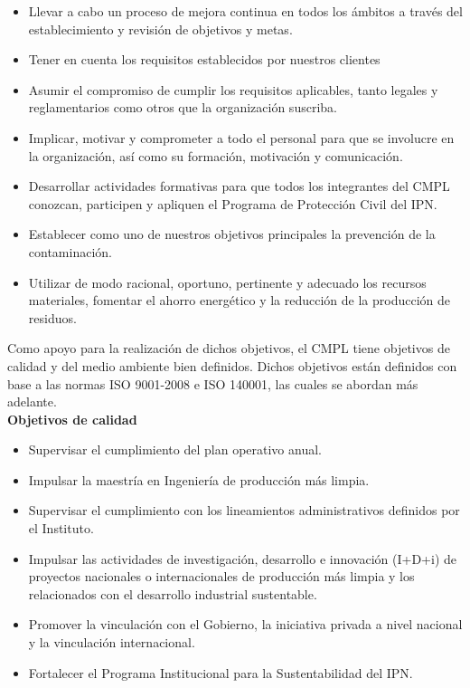 	\begin{itemize}
		\item Llevar a cabo un proceso de mejora continua en todos los ámbitos a través del establecimiento y revisión de objetivos y metas.
		\item Tener en cuenta los requisitos establecidos por nuestros clientes
		\item Asumir el compromiso de cumplir los requisitos aplicables, tanto legales y reglamentarios como otros que la organización suscriba.
		\item Implicar, motivar y comprometer a todo el personal para que se involucre en la organización, así como su formación, motivación y comunicación.
		\item Desarrollar actividades formativas para que todos los integrantes del CMPL conozcan, participen y apliquen el Programa de Protección Civil del IPN.
		\item Establecer como uno de nuestros objetivos principales la prevención de la contaminación. 	\item Utilizar de modo racional, oportuno, pertinente y adecuado los recursos materiales, fomentar el ahorro energético y la reducción de la producción de residuos. 
	\end{itemize}

	Como apoyo para la realización de dichos objetivos, el CMPL tiene objetivos de calidad y del medio ambiente bien definidos. Dichos objetivos están definidos con base a las normas ISO 9001-2008 e ISO 140001, las cuales se abordan más adelante.\\

\textbf{Objetivos de calidad}

\begin{itemize}
	\item Supervisar el cumplimiento del plan operativo anual.
	\item Impulsar la maestría en Ingeniería de producción más limpia.
	\item Supervisar el cumplimiento con los lineamientos administrativos definidos por el Instituto.
	\item Impulsar las actividades de investigación, desarrollo e innovación (I+D+i) de proyectos nacionales o internacionales de producción más limpia y los relacionados con el desarrollo industrial sustentable.
 \item Promover la vinculación con el Gobierno, la iniciativa privada a nivel nacional y la vinculación internacional.
	\item Fortalecer el Programa Institucional para la Sustentabilidad del IPN.
\end{itemize}

